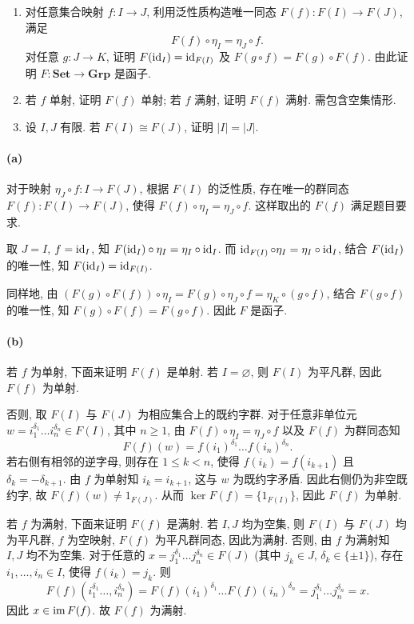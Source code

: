 \documentclass{article}
\begin{document}
\begin{problem}
  \begin{enumerate}
    \item[(a)] 对任意集合映射 $f:I\to J$, 利用泛性质构造唯一同态 $F(f):F(I)\to F(J)$, 满足
      \[
        F(f)\circ\eta_I=\eta_J\circ f.
      \]
      对任意 $g:J\to K$, 证明 $F(\operatorname{id}_I)=\operatorname{id}_{F(I)}$ 及 $F(g\circ f)=F(g)\circ F(f)$. 由此证明 $F:\mathbf{Set}\to\mathbf{Grp}$ 是函子.
    \item[(b)] 若 $f$ 单射, 证明 $F(f)$ 单射; 若 $f$ 满射, 证明 $F(f)$ 满射. 需包含空集情形.
    \item[(c)] 设 $I,J$ 有限. 若 $F(I)\cong F(J)$, 证明 $|I|=|J|$.
  \end{enumerate}
\end{problem}

\begin{solution}
	\paragraph{(a)} 对于映射 $\eta_J \circ f: I \to F(J)$, 根据 $F(I)$ 的泛性质, 存在唯一的群同态 $F(f): F(I) \to F(J)$, 使得 $F(f) \circ \eta_I = \eta_J \circ f$. 这样取出的 $F(f)$ 满足题目要求.

	取 $J=I$, $f = \operatorname{id}_I$, 知 $F(\operatorname{id}_I) \circ \eta_I = \eta_I \circ \operatorname{id}_I$. 而 $\operatorname{id}_{F(I)} \circ \eta_I = \eta_I \circ \operatorname{id}_I$, 结合 $F(\operatorname{id}_I)$ 的唯一性, 知 $F(\operatorname{id}_I) = \operatorname{id}_{F(I	)}$.

	同样地, 由 $(F(g) \circ F(f)) \circ \eta_I = F(g) \circ \eta_J \circ f = \eta_K \circ (g \circ f)$, 结合 $F(g\circ f)$ 的唯一性, 知 $F(g) \circ F(f) = F(g \circ f)$. 因此 $F$ 是函子.

	\paragraph{(b)} 若 $f$ 为单射, 下面来证明 $F(f)$ 是单射. 若 $I = \varnothing$, 则 $F(I)$ 为平凡群, 因此 $F(f)$ 为单射.

	否则, 取 $F(I)$ 与 $F(J)$ 为相应集合上的既约字群. 对于任意非单位元 $w = i_1^{\delta_1}\dots i_n^{\delta_n}\in F(I)$, 其中 $n\ge 1$, 由 $F(f)\circ\eta_I=\eta_J\circ f$ 以及 $F(f)$ 为群同态知
	\[ F(f)(w)=f(i_1)^{\delta_1}\dots f(i_n)^{\delta_n}. \]
	若右侧有相邻的逆字母, 则存在 $1\le k<n$, 使得 $f(i_k)=f(i_{k+1})$ 且 $\delta_k=-\delta_{k+1}$. 由 $f$ 为单射知 $i_k=i_{k+1}$, 这与 $w$ 为既约字矛盾. 因此右侧仍为非空既约字, 故 $F(f)(w)\neq 1_{F(J)}$. 从而 $\ker F(f)=\{1_{F(I)}\}$, 因此 $F(f)$ 为单射.

	若 $f$ 为满射, 下面来证明 $F(f)$ 是满射. 若 $I,J$ 均为空集, 则 $F(I)$ 与 $F(J)$ 均为平凡群, $f$ 为空映射, $F(f)$ 为平凡群同态, 因此为满射. 否则, 由 $f$ 为满射知 $I, J$ 均不为空集. 对于任意的 $x = j_1^{\delta_1} \dots j_n^{\delta_n} \in F(J)$ (其中 $j_k \in J$, $\delta_k \in \{\pm 1\}$), 存在 $i_1,\dots,i_n \in I$, 使得 $f(i_k) = j_k$. 则
	\[ F(f) (i_1^{\delta_1} \dots, i_n^{\delta_n}) 
	= F(f)(i_1)^{\delta_1} \dots F(f)(i_n)^{\delta_n}
	=j_1^{\delta_1} \dots j_n^{\delta_n} = x. \]
	因此 $x \in \operatorname{im} F(f)$. 故 $F(f)$ 为满射.


\end{solution}
\end{document}
